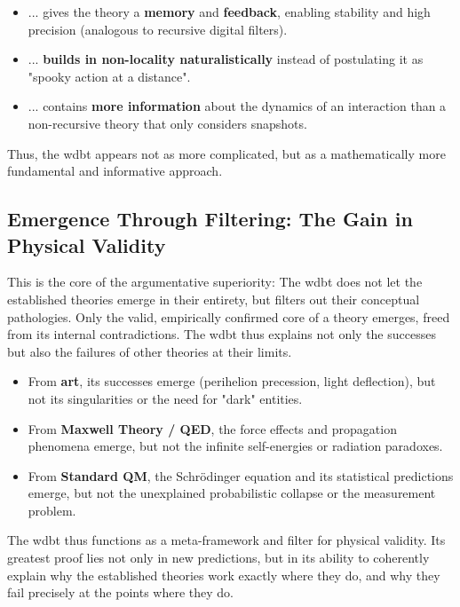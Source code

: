 \begin{itemize}
    \item ... gives the theory a \textbf{memory} and \textbf{feedback}, enabling stability and high precision (analogous to recursive digital filters).
    \item ... \textbf{builds in non-locality naturalistically} instead of postulating it as "spooky action at a distance".
    \item ... contains \textbf{more information} about the dynamics of an interaction than a non-recursive theory that only considers snapshots.
\end{itemize}

Thus, the \gls{wdbt} appears not as more complicated, but as a mathematically more fundamental and informative approach.

\subsection{Emergence Through Filtering: The Gain in Physical Validity}
This is the core of the argumentative superiority: The \gls{wdbt} does not let the established theories emerge in their entirety, but filters out their conceptual pathologies. Only the valid, empirically confirmed core of a theory emerges, freed from its internal contradictions. The \gls{wdbt} thus explains not only the successes but also the failures of other theories at their limits.

\begin{itemize}
    \item From \textbf{\gls{art}}, its successes emerge (perihelion precession, light deflection), but not its singularities or the need for "dark" entities.
    \item From \textbf{Maxwell Theory / QED}, the force effects and propagation phenomena emerge, but not the infinite self-energies or radiation paradoxes.
    \item From \textbf{Standard QM}, the Schrödinger equation and its statistical predictions emerge, but not the unexplained probabilistic collapse or the measurement problem.
\end{itemize}

The \gls{wdbt} thus functions as a meta-framework and filter for physical validity. Its greatest proof lies not only in new predictions, but in its ability to coherently explain why the established theories work exactly where they do, and why they fail precisely at the points where they do.

